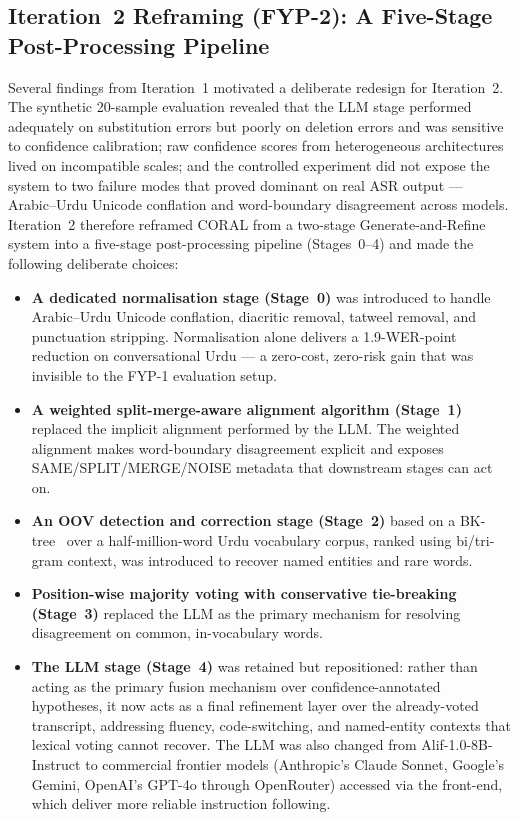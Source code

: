 \subsection{Iteration~2 Reframing (FYP-2): A Five-Stage Post-Processing Pipeline}
\label{ssec:iter2-reframing}

Several findings from Iteration~1 motivated a deliberate redesign for Iteration~2. The synthetic 20-sample evaluation revealed that the LLM stage performed adequately on substitution errors but poorly on deletion errors and was sensitive to confidence calibration; raw confidence scores from heterogeneous architectures lived on incompatible scales; and the controlled experiment did not expose the system to two failure modes that proved dominant on real ASR output --- Arabic--Urdu Unicode conflation and word-boundary disagreement across models. Iteration~2 therefore reframed CORAL from a two-stage Generate-and-Refine system into a five-stage post-processing pipeline (Stages~0--4) and made the following deliberate choices:

\begin{itemize}
  \item \textbf{A dedicated normalisation stage (Stage~0)} was introduced to handle Arabic--Urdu Unicode conflation, diacritic removal, tatweel removal, and punctuation stripping. Normalisation alone delivers a 1.9-WER-point reduction on conversational Urdu --- a zero-cost, zero-risk gain that was invisible to the FYP-1 evaluation setup.
  \item \textbf{A weighted split-merge-aware alignment algorithm (Stage~1)} replaced the implicit alignment performed by the LLM. The weighted alignment makes word-boundary disagreement explicit and exposes SAME/SPLIT/MERGE/NOISE metadata that downstream stages can act on.
  \item \textbf{An OOV detection and correction stage (Stage~2)} based on a BK-tree~\cite{burkhard1973bk} over a half-million-word Urdu vocabulary corpus, ranked using bi/tri-gram context, was introduced to recover named entities and rare words.
  \item \textbf{Position-wise majority voting with conservative tie-breaking (Stage~3)} replaced the LLM as the primary mechanism for resolving disagreement on common, in-vocabulary words.
  \item \textbf{The LLM stage (Stage~4)} was retained but repositioned: rather than acting as the primary fusion mechanism over confidence-annotated hypotheses, it now acts as a final refinement layer over the already-voted transcript, addressing fluency, code-switching, and named-entity contexts that lexical voting cannot recover. The LLM was also changed from Alif-1.0-8B-Instruct to commercial frontier models (Anthropic's Claude Sonnet, Google's Gemini, OpenAI's GPT-4o through OpenRouter) accessed via the front-end, which deliver more reliable instruction following.
\end{itemize}


